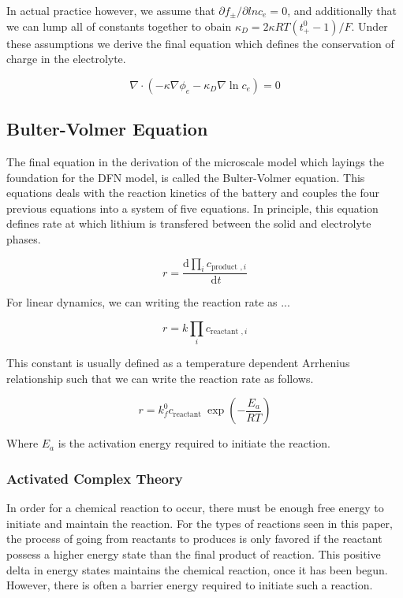 \documentclass[lettersize,journal]{IEEEtran}
\begin{document}
\noindent In actual practice however, we assume that $\partial{f_{\pm}}/\partial ln {c_e} = 0 $, and additionally that we can lump all of constants together to obain $\kappa_{D}=2 \kappa R T\left(t_{+}^{0}-1\right) / F$. Under these assumptions we derive the final equation which defines the conservation of charge in the electrolyte.

\begin{equation}
\nabla \cdot\left(-\kappa \nabla \phi_{e}-\kappa_{D} \nabla \ln c_{e}\right)=0
\end{equation}


\subsection{Bulter-Volmer Equation}
The final equation in the derivation of the microscale model which layings the foundation for the DFN model, is called the Bulter-Volmer equation. This equations deals with the reaction kinetics of the battery and couples the four previous equations into a system of five equations. In principle, this equation defines rate at which lithium is transfered between the solid and electrolyte phases.

\begin{equation}
r=\frac{\mathrm{d} \prod_{i} c_{\text {product }, i}}{\mathrm{~d} t}
\end{equation}

\noindent For linear dynamics, we can writing the reaction rate as ...

\begin{equation}
r=k \prod_{i} c_{\text {reactant }, i}
\end{equation}

\noindent This constant is usually defined as a temperature dependent Arrhenius relationship such that we can write the reaction rate as follows.

\begin{equation}
 r=k_{f}^{0} c_{\text {reactant }} \exp \left(-\frac{E_{a}}{R T}\right)
\end{equation}

\noindent Where $E_a$ is the activation energy required to initiate the reaction.

\subsubsection{Activated Complex Theory}

\noindent In order for a chemical reaction to occur, there must be enough free energy to initiate and maintain the reaction. For the types of reactions seen in this paper, the process of going from reactants to produces is only favored if the reactant possess a higher energy state than the final product of reaction. This positive delta in energy states maintains the chemical reaction, once it has been begun. However, there is often a barrier energy required to initiate such a reaction. \\
\end{document}
